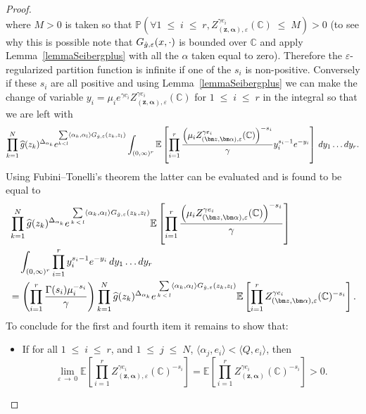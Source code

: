 \documentclass[10pt]{amsart}
\theoremstyle{definition}\newtheorem{defi}[theo]{Definition}\newtheorem{rema}[theo]{Remark}\newtheorem{exam}[theo]{Example}\newtheorem{exem}[theo]{Example}\newtheorem{nota}[theo]{Notation}
\renewcommand{\leq}{\;\leqslant\;}
\newcommand{\C}{\mathbb{C}}
\newcommand{\E}{\mathbb{E}}
\newcommand{\bbP}{\mathbb{P}}
\newcommand{\ps}[1]{\langle #1 \rangle}
\newcommand*\eps{\varepsilon}
\let\oldhat\hat
\renewcommand*{\hat}[1]{\mathchoice{\widehat{#1}}{\widehat{#1}}{\oldhat{#1}}{\oldhat{#1}}}
\let\oldforall\forall
\renewcommand*{\forall}{\mathrel{\oldforall}}
\begin{document}
\begin{proof}
\[\]
where $M>0$ is taken so that $\bbP\left(\forall 1\leq i\leq r,Z_{(\bm z,\bm \alpha),\eps}^{\gamma e_i} (\C) \leq M\right)>0$ (to see why this is possible note that $G_{\hat{g},\eps}(x,\cdot)$ is bounded over $\C$ and apply Lemma~\ref{lemmaSeibergplus} with all the $\alpha$ taken equal to zero). Therefore the $\eps$-regularized partition function is infinite if one of the $s_i$ is non-positive. Conversely if these $s_i$ are all positive and using Lemma~\ref{lemmaSeibergplus} we can make the change of variable $y_i=\mu_i e^{\gamma c_i}Z_{(\bm z,\bm \alpha),\eps}^{\gamma e_i} (\C)$ for $1\leq i\leq r$ in the integral so that we are left with
\begin{align*}
\prod_{k=1}^N \hat g (z_k)^{\Delta_{\alpha_k}}e^{ \sum\limits_{ k < l} \left\langle\alpha_k,\alpha_l \right\rangle G_{\hat g,\eps}(z_k,z_l) }\int_{ (0,\infty)^{r}} \E \left[\prod_{i=1}^{r} \frac{\left(\mu_i Z_{(\bm z,\bm \alpha),\eps}^{\gamma e_i} (\C)\right)^{- s_i}}\gamma y_i^{s_i-1}e^{- y_i} \right]\,dy_1\dots dy_{r}.
\end{align*}
Using Fubini--Tonelli's theorem the latter can be evaluated and is found to be equal to
\begin{align*}
&\prod_{k=1}^N \hat g (z_k)^{\Delta_{\alpha_k}}e^{\,\sum\limits_{ k\,<\,l} \left\langle\alpha_k,\alpha_l \right\rangle G_{\hat g,\eps}(z_k,z_l) }\E \left [\prod_{i=1}^{r} \frac{\left(\mu_i Z_{(\bm z,\bm \alpha),\eps}^{\gamma e_i} (\C)\right)^{- s_i}}\gamma \right]\\
&\quad\int_{ (0,\infty)^{r}} \prod_{i=1}^{r} y_i^{s_i-1}e^{- y_i} \,dy_1\dots dy_{r}\\
&=\left (\prod_{i=1}^{r} \frac{\Gamma (s_i)\mu_i^{- s_i}}\gamma \right)\prod_{k=1}^N \hat g (z_k)^{\Delta_{\alpha_k}} e^{\,\sum\limits_{ k\,<\,l} \langle\alpha_k,\alpha_l \rangle G_{\hat g,\eps}(z_k,z_l) } \E \left [\prod_{i=1}^{r} Z_{\left(\bm z,\bm \alpha\right),\eps}^{\gamma e_i} (\C)^{- s_i} \right].
\end{align*}
To conclude for the first and fourth item it remains to show that:
\begin{itemize}
\item If for all $1\leq i \leq r$, and $1\leq j\leq N$, $\ps{\alpha_j,e_i}<\ps{Q,e_i}$, then
\begin{equation*}
\lim\limits_{\eps\,\rightarrow\,0}\E \left [\prod_{i=1}^{r} Z_{\left(\bm z,\bm \alpha\right), \eps}^{\gamma e_i} (\C)^{- s_i} \right]=\E \left [\prod_{i=1}^{r} Z_{\left(\bm z,\bm \alpha\right)}^{\gamma e_i} (\C)^{- s_i} \right]>0.
\end{equation*}

\end{itemize}
\end{proof}
\end{document}
